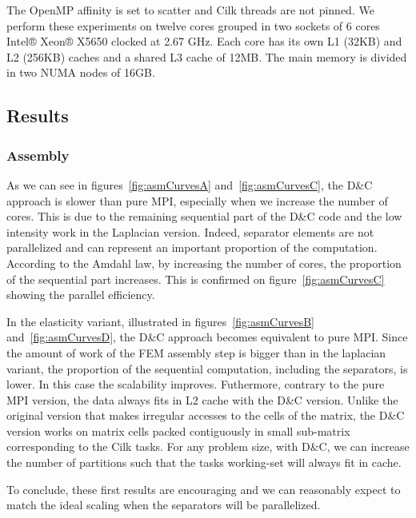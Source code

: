 \documentclass{IOS-Book-Article}
\begin{document}
The OpenMP affinity is set to scatter and Cilk threads are not pinned.
We perform these experiments on twelve cores grouped in two sockets of 6 cores Intel® Xeon® X5650 clocked at 2.67 GHz.
Each core has its own L1 (32KB) and L2 (256KB) caches and a shared L3 cache of 12MB. The main memory is divided in two NUMA nodes of 16GB.

\subsection{Results}
\subsubsection{Assembly}
As we can see in figures~\ref{fig:asmCurvesA} and~\ref{fig:asmCurvesC}, the D\&C approach is slower than pure MPI, especially when we increase the number of cores.
This is due to the remaining sequential part of the D\&C code and the low intensity work in the Laplacian version.
Indeed, separator elements are not parallelized and can represent an important proportion of the computation.
According to the Amdahl law, by increasing the number of cores, the proportion of the sequential part increases.
This is confirmed on figure~\ref{fig:asmCurvesC} showing the parallel efficiency.

In the elasticity variant, illustrated in figures~\ref{fig:asmCurvesB} and~\ref{fig:asmCurvesD}, the D\&C approach becomes equivalent to pure MPI.
Since the amount of work of the FEM assembly step is bigger than in the laplacian variant, the proportion of the sequential computation, including the separators, is lower.
In this case the scalability improves. Futhermore, contrary to the pure MPI version, the data always fits in L2 cache with the D\&C version.
Unlike the original version that makes irregular accesses to the cells of the matrix, the D\&C version works on matrix cells packed contiguously in small sub-matrix corresponding to the Cilk tasks.
For any problem size, with D\&C, we can increase the number of partitions such that the tasks working-set will always fit in cache.

To conclude, these first results are encouraging and we can reasonably expect to match the ideal scaling when the separators will be parallelized.
\end{document}
